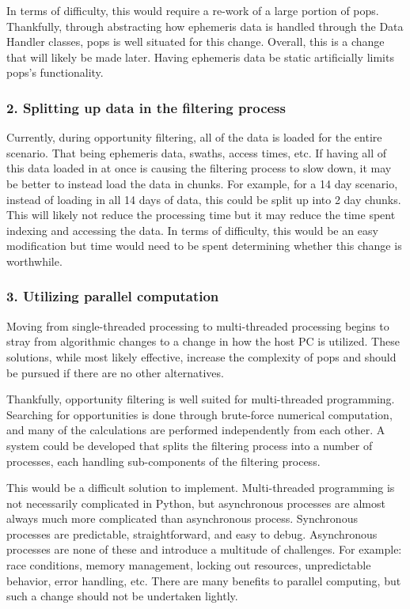 In terms of difficulty, this would require a re-work of a large portion of
\gls{pops}.  Thankfully, through abstracting how ephemeris data is handled
through the Data Handler classes, \gls{pops} is well situated for this change.
Overall, this is a change that will likely be made later.  Having ephemeris
data be static artificially limits \gls{pops}'s functionality.


\subsubsection{2. Splitting up data in the filtering process}

Currently, during opportunity filtering, all of the data is loaded for the
entire scenario. That being ephemeris data, swaths, access times, etc. If
having all of this data loaded in at once is causing the filtering process to
slow down, it may be better to instead load the data in chunks. For example,
for a 14 day scenario, instead of loading in all 14 days of data, this could be
split up into 2 day chunks. This will likely not reduce the processing time but
it may reduce the time spent indexing and accessing the data. In terms of
difficulty, this would be an easy modification but time would need to be spent
determining whether this change is worthwhile.


\subsubsection{3. Utilizing parallel computation}

Moving from single-threaded processing to multi-threaded processing begins to
stray from algorithmic changes to a change in how the host PC is utilized.
These solutions, while most likely effective, increase the complexity of
\gls{pops} and should be pursued if there are no other alternatives.

Thankfully, opportunity filtering is well suited for multi-threaded
programming. Searching for opportunities is done through brute-force numerical
computation, and many of the calculations are performed independently from each
other. A system could be developed that splits the filtering process into a
number of processes, each handling sub-components of the filtering process. 

This would be a difficult solution to implement. Multi-threaded programming is
not necessarily complicated in Python, but asynchronous processes are almost
always much more complicated than asynchronous process. Synchronous processes
are predictable, straightforward, and easy to debug. Asynchronous processes are
none of these and introduce a multitude of challenges. For example: race
conditions, memory management, locking out resources, unpredictable behavior,
error handling, etc.  There are many benefits to parallel computing, but such a
change should not be undertaken lightly.


